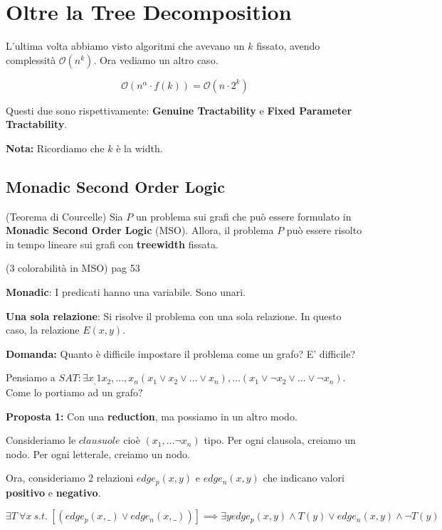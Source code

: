 \section{Oltre la Tree Decomposition}

L'ultima volta abbiamo visto algoritmi che avevano un $k$ fissato, avendo
complessità $\mathcal{O}(n^k)$. Ora vediamo un altro caso.

$$\mathcal{O}(n^\alpha \cdot f(k)) = \mathcal{O}(n \cdot 2^k)$$

Questi due sono rispettivamente: \textbf{Genuine Tractability} e \textbf{Fixed
    Parameter Tractability}.

\textbf{Nota:} Ricordiamo che $k$ è la width.

\subsection{Monadic Second Order Logic}
\begin{theorem}(Teorema di Courcelle)
    Sia $P$ un problema sui grafi che può essere formulato in \textbf{Monadic Second Order Logic} (MSO). Allora, il problema $P$ può
    essere risolto in tempo lineare sui grafi con \textbf{treewidth} fissata.
\end{theorem}

\begin{esempio}(3 colorabilità in MSO)
    pag 53

    \textbf{Monadic}: I predicati hanno una variabile. Sono unari.

    \textbf{Una sola relazione}: Si risolve il problema con una sola relazione. In questo caso, la relazione $E(x,y)$.
\end{esempio}

\textbf{Domanda:} Quanto è difficile impostare il problema come un grafo? E' difficile?

Pensiamo a $SAT: \exists x_,1x_2,\dots,x_n ( x_1 \lor x_2 \lor \dots \lor x_n
    ), \dots (x_1 \lor \lnot x_2 \lor \dots \lor \lnot x_n)$. Come lo portiamo ad
un grafo?

\textbf{Proposta 1:} Con una \textbf{reduction}, ma possiamo in un altro modo.

Consideriamo le $clausuole$ cioè $(x_1, \dots \lnot x_n)$ tipo. Per ogni
clausola, creiamo un nodo. Per ogni letterale, creiamo un nodo.

Ora, consideriamo 2 relazioni $edge_p(x,y)$ e $edge_n(x,y)$ che indicano valori 
\textbf{positivo} e \textbf{negativo}.

$$
    \exists T \ \forall x \ s.t. \ [(edge_p(x,\_) \lor edge_n(x,\_))] \implies \exists y edge_p(x,y) \land T(y) \lor edge_n(x,y) \land \lnot T(y)
$$

